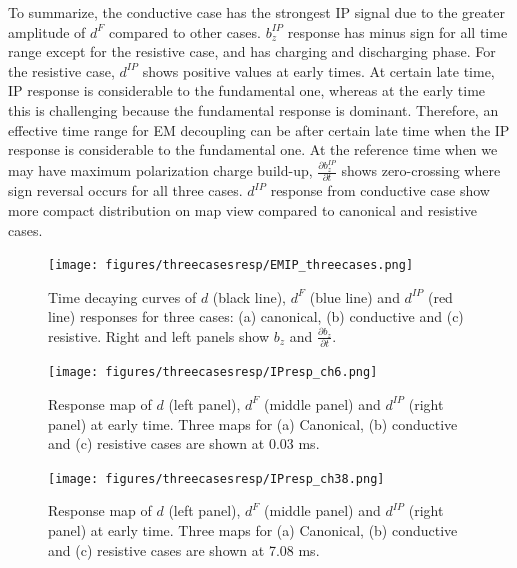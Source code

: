 \documentclass[a4paper, 11pt]{article}
\newcommand{\dip}{d^{IP}}
\begin{document}
To summarize, the conductive case has the strongest IP signal due to the greater amplitude of $d^{F}$ compared to other cases. $b^{IP}_z$ response has minus sign for all time range except for the resistive case, and has charging and discharging phase. For the resistive case, $\dip$ shows positive values at early times. At certain late time, IP response is considerable to the fundamental one, whereas at the early time this is challenging because the fundamental response is dominant. Therefore, an effective time range for EM decoupling can be after certain late time when the IP response is considerable to the fundamental one. At the reference time when we may have maximum polarization charge build-up, $\frac{\partial b^{IP}_z}{\partial t}$ shows zero-crossing where sign reversal occurs for all three cases. $\dip$ response from conductive case show more compact distribution on map view compared to canonical and resistive cases. 

\begin{figure}[htb]
\texttt{[image: figures/threecasesresp/EMIP\_threecases.png]}
  \centering
  \caption{Time decaying curves of $d$ (black line), $d^F$ (blue line) and $\dip$ (red line) responses for three cases: (a) canonical, (b) conductive and (c) resistive. Right and left panels show $b_z$ and $\frac{\partial b_z}{\partial t}$. }
  \label{F:IPrespCurves}
\end{figure}


\begin{figure}[htb]
  \centering  \texttt{[image: figures/threecasesresp/IPresp\_ch6.png]}
  \caption{Response map of $d$ (left panel), $d^{F}$ (middle panel) and $\dip$ (right panel) at early time. Three maps for  (a) Canonical, (b) conductive and (c) resistive cases are shown at 0.03 ms.}
  \label{F:IPresp1}
\end{figure}

\begin{figure}[htb]
  \centering  \texttt{[image: figures/threecasesresp/IPresp\_ch38.png]}
  \caption{Response map of $d$ (left panel), $d^{F}$ (middle panel) and $\dip$ (right panel) at early time. Three maps for  (a) Canonical, (b) conductive and (c) resistive cases are shown at 7.08 ms.}
  \label{F:IPresp2}
\end{figure}
\clearpage
\end{document}
